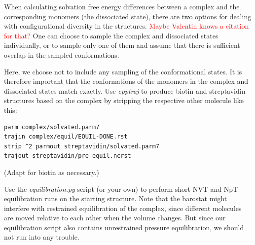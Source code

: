 \documentclass[9pt,tutorial]{livecoms}
\newcommand{\software}{\emph}
\newcommand{\todo}{\textcolor{red}}
\begin{document}
When calculating solvation free energy differences between a complex and the corresponding monomers (the dissociated state), there are two options for dealing with configurational diversity in the structures.
\todo{Maybe Valentin knows a citation for that?}
One can choose to sample the complex and dissociated states individually, or to sample only one of them and assume that there is sufficient overlap in the sampled conformations.

Here, we choose not to include any sampling of the conformational states. 
It is therefore important that the conformations of the monomers in the complex and dissociated states match exactly. 
Use \software{cpptraj} to produce biotin and streptavidin structures based on the complex by stripping the respective other molecule like this:
\begin{lstlisting}
parm complex/solvated.parm7
trajin complex/equil/EQUIL-DONE.rst
strip ^2 parmout streptavidin/solvated.parm7
trajout streptavidin/pre-equil.ncrst
\end{lstlisting}
(Adapt for biotin as necessary.)


Use the \software{equilibration.py} script (or your own) to perform short NVT and NpT equilibration runs on the starting structure.
Note that the barostat might interfere with restrained equilibration of the complex, since different molecules are moved relative to each other when the volume changes.
But since our equilibration script also contains unrestrained pressure equilibration, we should not run into any trouble.
\end{document}
